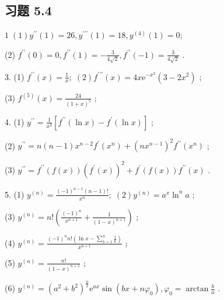 \subsection{习题 5.4}

\(1\;\left( 1\right) {y}^{\prime \prime }\left( 1\right)  = {26},{y}^{\prime \prime \prime }\left( 1\right)  = {18},{y}^{\left( 4\right) }\left( 1\right)  = 0;\)

(2) \({f}^{\prime \prime }\left( 0\right)  = 0,{f}^{\prime \prime }\left( 1\right)  =  - \frac{3}{4\sqrt{2}},{f}^{\prime \prime }\left( {-1}\right)  = \frac{3}{4\sqrt{2}}\) .

3. (1) \({f}^{\prime \prime }\left( x\right)  = \frac{1}{x};\;\left( 2\right) {f}^{\prime \prime \prime }\left( x\right)  = {4x}{\mathrm{e}}^{-{x}^{2}}\left( {3 - 2{x}^{2}}\right)\) ;

(3) \({f}^{\left( 5\right) }\left( x\right)  = \frac{24}{{\left( 1 + x\right) }^{5}}\) ;

4. (1) \({y}^{\prime \prime } = \frac{1}{{x}^{2}}\left\lbrack  {{f}^{\prime \prime }\left( {\ln x}\right)  - {f}^{\prime }\left( {\ln x}\right) }\right\rbrack\) ;

(2) \({y}^{\prime \prime } = n\left( {n - 1}\right) {x}^{n - 2}{f}^{\prime }\left( {x}^{n}\right)  + {\left( n{x}^{n - 1}\right) }^{2}{f}^{\prime \prime }\left( {x}^{n}\right)\) ;

(3) \({y}^{\prime \prime } = {f}^{\prime \prime }\left( {f\left( x\right) }\right) {\left( {f}^{\prime }\left( x\right) \right) }^{2} + {f}^{\prime }\left( {f\left( x\right) }\right) {f}^{\prime \prime }\left( x\right)\) .

5. (1) \({y}^{\left( n\right) } = \frac{{\left( -1\right) }^{n - 1}\left( {n - 1}\right) !}{{x}^{n}};\;\left( 2\right) {y}^{\left( n\right) } = {a}^{x}{\ln }^{n}a\) ;

(3) \({y}^{\left( n\right) } = n!\left( {\frac{{\left( -1\right) }^{n}}{{x}^{n + 1}} + \frac{1}{{\left( 1 - x\right) }^{n + 1}}}\right)\) ;

(4) \({y}^{\left( n\right) } = \frac{{\left( -1\right) }^{n}n!\left( {\ln x - \mathop{\sum }\limits_{{k = 1}}^{n}\frac{1}{k}}\right) }{{x}^{n + 1}}\) ;

(5) \({y}^{\left( n\right) } = \frac{n!}{{\left( 1 - x\right) }^{n + 1}}\) ;

(6) \({y}^{\left( n\right) } = {\left( {a}^{2} + {b}^{2}\right) }^{\frac{n}{2}}{\mathrm{e}}^{ax}\sin \left( {{bx} + n{\varphi }_{0}}\right) ,{\varphi }_{0} = \arctan \frac{b}{a}\) .

